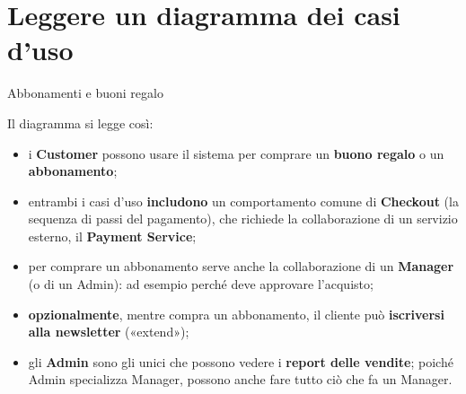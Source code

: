 \section{Leggere un diagramma dei casi d'uso}

\begin{esempio}{Abbonamenti e buoni regalo}
\begin{center}
\end{center}
Il diagramma si legge così:
\begin{itemize}
  \item i \textbf{Customer} possono usare il sistema per comprare un \textbf{buono regalo} o un \textbf{abbonamento};
  \item entrambi i casi d'uso \textbf{includono} un comportamento comune di \textbf{Checkout} (la sequenza di passi del pagamento),
        che richiede la collaborazione di un servizio esterno, il \textbf{Payment Service};
  \item per comprare un abbonamento serve anche la collaborazione di un \textbf{Manager} (o di un Admin): ad esempio perché
        deve approvare l'acquisto;
  \item \textbf{opzionalmente}, mentre compra un abbonamento, il cliente può \textbf{iscriversi alla newsletter} («extend»);
  \item gli \textbf{Admin} sono gli unici che possono vedere i \textbf{report delle vendite}; poiché Admin specializza Manager,
        possono anche fare tutto ciò che fa un Manager.
\end{itemize}
\end{esempio}

